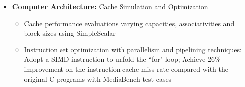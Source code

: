 \documentclass[letterpaper,10pt]{article}
\newcommand{\resitem}[1]{\item #1 \vspace{-2pt}}
\begin{document}
\begin{itemize}
\item { {\bf Computer Architecture:} Cache Simulation and Optimization}
 \vspace{-1mm}
	\begin{itemize}
		\resitem { Cache performance evaluations varying capacities, associativities and block sizes using SimpleScalar}
		\resitem { Instruction set optimization with parallelism and pipelining techniques: Adopt a SIMD instruction to unfold the ``for" loop; Achieve 26\% improvement on the instruction cache miss rate compared with the original C programs with MediaBench test cases}
	\end{itemize}
 \vspace{-1mm}
 
 
 




\end{itemize}
\end{document}
